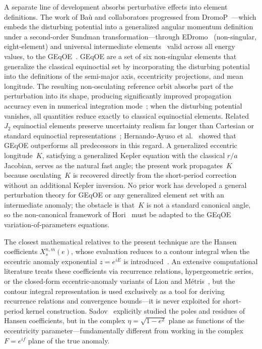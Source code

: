 A separate line of development absorbs perturbative effects into element
definitions.  The work of Ba\`u and collaborators progressed from
DromoP~\cite{bau2013}---which embeds the disturbing potential into a
generalized angular momentum definition under a second-order Sundman
transformation---through EDromo~\cite{bau2015} (non-singular,
eight-element) and universal intermediate elements~\cite{bauroa2020}
valid across all energy values, to the GEqOE~\cite{bau2021}.  GEqOE are
a set of six non-singular elements that generalize the classical
equinoctial set by incorporating the disturbing potential into the
definitions of the semi-major axis, eccentricity projections, and mean
longitude.  The resulting non-osculating reference orbit absorbs part of
the perturbation into its shape, producing significantly improved
propagation accuracy even in numerical integration mode~\cite{bau2021};
when the disturbing potential vanishes, all quantities reduce exactly to
classical equinoctial elements.  Related $J_2$ equinoctial elements preserve uncertainty realism far
longer than Cartesian or standard equinoctial
representations~\cite{aristoff2021}; Hernando-Ayuso et
al.~\cite{hernandoayuso2023} showed that GEqOE outperforms all
predecessors in this regard.  A generalized eccentric
longitude~$K$, satisfying a generalized Kepler equation with the classical
$r/a$ Jacobian, serves as the natural fast angle; the present work
propagates~$K$ because osculating~$K$ is recovered directly from the
short-period correction without an additional Kepler inversion.
No prior work has developed a general perturbation theory for GEqOE or
any generalized element set with an intermediate anomaly; the obstacle is
that~$K$ is not a standard canonical angle, so the non-canonical framework
of Hori~\cite{hori1971} must be adapted to the GEqOE
variation-of-parameters equations.

The closest mathematical relatives to the present technique are the Hansen
coefficients $X_s^{n,m}(e)$, whose evaluation reduces to a contour
integral when the eccentric anomaly exponential $z = e^{iE}$ is
introduced~\cite{giacaglia1976}.  An extensive computational literature
treats these coefficients via recurrence relations, hypergeometric series,
or the closed-form eccentric-anomaly variants of Lion and
M\'etris~\cite{lion2013}, but the contour integral representation is used
exclusively as a tool for deriving recurrence relations and convergence
bounds---it is never exploited for short-period kernel construction.
Sadov~\cite{sadov2008} explicitly studied the poles and residues of Hansen
coefficients, but in the complex $\eta = \sqrt{1-e^2}$ plane as functions
of the eccentricity parameter---fundamentally different from working in
the complex $F = e^{if}$ plane of the true anomaly.

